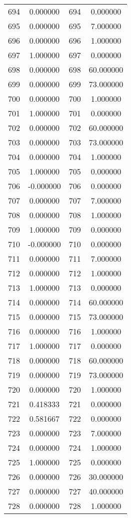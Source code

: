 \documentclass[12pt]{article}
\begin{document}
\begin{longtable}{@{}cccc@{}}
694 & 0.000000 & 694 & 0.000000 \\
695 & 0.000000 & 695 & 7.000000 \\
696 & 0.000000 & 696 & 1.000000 \\
697 & 1.000000 & 697 & 0.000000 \\
698 & 0.000000 & 698 & 60.000000 \\
699 & 0.000000 & 699 & 73.000000 \\
700 & 0.000000 & 700 & 1.000000 \\
701 & 1.000000 & 701 & 0.000000 \\
702 & 0.000000 & 702 & 60.000000 \\
703 & 0.000000 & 703 & 73.000000 \\
704 & 0.000000 & 704 & 1.000000 \\
705 & 1.000000 & 705 & 0.000000 \\
706 & -0.000000 & 706 & 0.000000 \\
707 & 0.000000 & 707 & 7.000000 \\
708 & 0.000000 & 708 & 1.000000 \\
709 & 1.000000 & 709 & 0.000000 \\
710 & -0.000000 & 710 & 0.000000 \\
711 & 0.000000 & 711 & 7.000000 \\
712 & 0.000000 & 712 & 1.000000 \\
713 & 1.000000 & 713 & 0.000000 \\
714 & 0.000000 & 714 & 60.000000 \\
715 & 0.000000 & 715 & 73.000000 \\
716 & 0.000000 & 716 & 1.000000 \\
717 & 1.000000 & 717 & 0.000000 \\
718 & 0.000000 & 718 & 60.000000 \\
719 & 0.000000 & 719 & 73.000000 \\
720 & 0.000000 & 720 & 1.000000 \\
721 & 0.418333 & 721 & 0.000000 \\
722 & 0.581667 & 722 & 0.000000 \\
723 & 0.000000 & 723 & 7.000000 \\
724 & 0.000000 & 724 & 1.000000 \\
725 & 1.000000 & 725 & 0.000000 \\
726 & 0.000000 & 726 & 30.000000 \\
727 & 0.000000 & 727 & 40.000000 \\
728 & 0.000000 & 728 & 1.000000 \\

\end{longtable}
\end{document}
